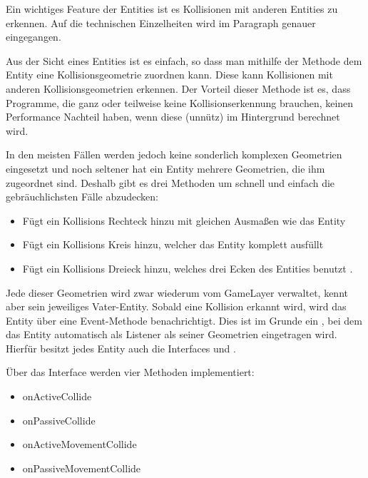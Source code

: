 Ein wichtiges Feature der Entities ist es Kollisionen mit anderen Entities zu erkennen. Auf die technischen Einzelheiten wird im Paragraph  genauer eingegangen.

Aus der Sicht eines Entities ist es einfach, so dass man mithilfe der Methode  dem Entity eine Kollisionsgeometrie zuordnen kann. Diese kann Kollisionen mit anderen Kollisionsgeometrien erkennen.
Der Vorteil dieser Methode ist es, dass Programme, die ganz oder teilweise keine Kollisionserkennung brauchen, keinen Performance Nachteil haben, wenn diese (unnütz) im Hintergrund berechnet wird.

In den meisten Fällen werden jedoch keine sonderlich komplexen Geometrien eingesetzt und noch seltener hat ein Entity mehrere Geometrien, die ihm zugeordnet sind.
Deshalb gibt es drei Methoden um schnell und einfach die gebräuchlichsten Fälle abzudecken:

\begin{itemize}
	\item {} Fügt ein Kollisions Rechteck hinzu mit gleichen Ausmaßen wie das Entity
	\item {} Fügt ein Kollisions Kreis hinzu, welcher das Entity komplett ausfüllt
	\item {} Fügt ein Kollisions Dreieck hinzu, welches drei Ecken des Entities benutzt .
\end{itemize}

Jede dieser Geometrien wird zwar wiederum vom GameLayer verwaltet, kennt aber sein jeweiliges Vater-Entity. Sobald eine Kollision erkannt wird, wird das Entity über eine Event-Methode benachrichtigt. Dies ist im Grunde ein , bei dem das Entity automatisch als Listener als seiner Geometrien eingetragen wird. Hierfür besitzt jedes Entity auch die Interfaces  und .

Über das Interface  werden vier Methoden implementiert:

\begin{itemize}
	\item onActiveCollide
	\item onPassiveCollide
	\item onActiveMovementCollide
	\item onPassiveMovementCollide
\end{itemize}

